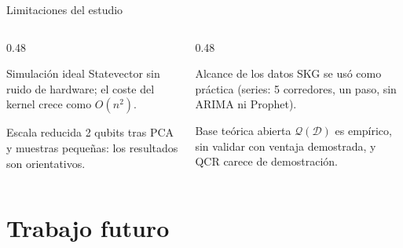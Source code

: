 \documentclass[aspectratio=169,10pt,professionalfonts]{beamer}
\begin{document}
\begin{frame}{Limitaciones del estudio}
\begin{columns}[T]
\begin{column}{0.48\textwidth}
\begin{block}{Simulación ideal}
Statevector sin ruido de hardware; el coste del kernel crece como $O(n^2)$.
\end{block}
\begin{block}{Escala reducida}
2 qubits tras PCA y muestras pequeñas: los resultados son orientativos.
\end{block}
\end{column}
\begin{column}{0.48\textwidth}
\begin{block}{Alcance de los datos}
SKG se usó como práctica (series: 5 corredores, un paso, sin ARIMA ni Prophet).
\end{block}
\begin{block}{Base teórica abierta}
$\mathcal{Q}(\mathcal{D})$ es empírico, sin validar con ventaja demostrada, y QCR carece de demostración.
\end{block}
\end{column}
\end{columns}
\end{frame}

\section{Trabajo futuro}
\end{document}
